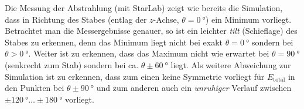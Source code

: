 
Die Messung der Abstrahlung (mit StarLab) zeigt wie bereits die Simulation,
dass in Richtung des Stabes (entlag der $z$-Achse, $\theta=\SI{0}{\degree}$) ein
Minimum vorliegt. Betrachtet man die Messergebnisse genauer, so ist ein
leichter \emph{tilt} (Schieflage) des Stabes zu erkennen, denn das
Minimum liegt nicht bei exakt $\theta=\SI{0}{\degree}$ sondern bei
$\theta > \SI{0}{\degree}$. Weiter ist zu erkennen, dass das Maximum
nicht wie erwartet bei $\theta=\SI{90}{\degree}$ (senkrecht zum Stab)
sondern bei ca. $\theta \pm \SI{60}{\degree}$ liegt. Als weitere
Abweichung zur Simulation ist zu erkennen, dass zum einen keine
Symmetrie vorliegt für $E_{\mathrm{total}}$ in den Punkten
bei $\theta \pm \SI{90}{\degree}$ und zum anderen auch ein
\emph{unruhiger} Verlauf zwischen
$\pm \SI{120}{\degree} \dots \pm \SI{180}{\degree}$ vorliegt.

%
%
%
